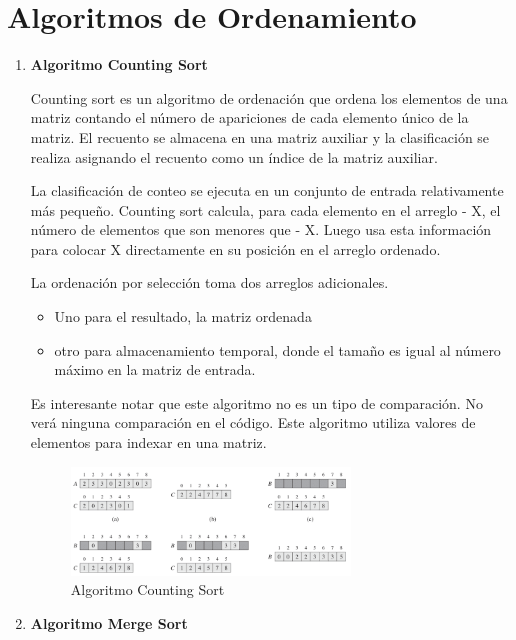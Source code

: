 \documentclass{article}
\begin{document}
	\section{Algoritmos de Ordenamiento}\label{sec:ejercicios}
	\begin{enumerate}
		\item \textbf{Algoritmo Counting Sort}
		
			Counting sort es un algoritmo de ordenación que ordena los elementos de una matriz contando el número de apariciones de cada elemento único de la matriz. El recuento se almacena en una matriz auxiliar y la clasificación se realiza asignando el recuento como un índice de la matriz auxiliar.
			
La clasificación de conteo se ejecuta en un conjunto de entrada relativamente más pequeño. Counting sort calcula, para cada elemento en el arreglo - X, el número de elementos que son menores que - X. Luego usa esta información para colocar X directamente en su posición en el arreglo ordenado.

La ordenación por selección toma dos arreglos adicionales.

\begin{itemize}
   \item Uno para el resultado, la matriz ordenada
   \item otro para almacenamiento temporal, donde el tamaño es   igual al número máximo en la matriz de entrada.
 \end{itemize}	
 
 Es interesante notar que este algoritmo no es un tipo de comparación. No verá ninguna comparación en el código. Este algoritmo utiliza valores de elementos para indexar en una matriz.
		
\begin{figure}[H]
\centering
\includegraphics[width=0.7\textwidth]{Imagen/CountS}
\caption{Algoritmo Counting Sort}
\label{fig:CountS}
\end{figure}



\item \textbf{Algoritmo Merge Sort}
        

\end{enumerate}
\end{document}

